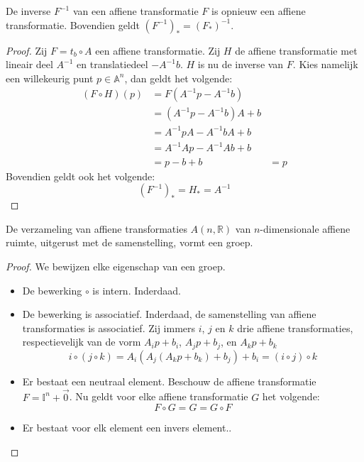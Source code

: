 \documentclass[main.tex]{subfiles}
\begin{document}
\begin{st}
  \label{st:samenstelling-affiene-transformatie-inverse}
  De inverse $F^{-1}$ van een affiene transformatie $F$ is opnieuw een affiene transformatie.
  Bovendien geldt $(F^{-1})_{*} = (F_{*})^{-1}$.

  \begin{proof}
    Zij $F = t_{b} \circ A$ een affiene transformatie.
    Zij $H$ de affiene transformatie met lineair deel $A^{-1}$ en translatiedeel $-A^{-1}b$.
    $H$ is nu de inverse van $F$.
    Kies namelijk een willekeurig punt $p\in \mathbb{A}^{n}$, dan geldt het volgende:
    \[
    \begin{array}{rll}
      (F \circ H)(p) &= F(A^{-1}p - A^{-1}b) &\\
                     &= (A^{-1}p - A^{-1}b)A + b &\\
                     &= A^{-1}pA - A^{-1}bA + b &\\
                     &= A^{-1}Ap - A^{-1}Ab + b &\\
                     &= p - b + b &= p
    \end{array}
    \]
    Bovendien geldt ook het volgende:
    \[ (F^{-1})_{*} = H_{*} = A^{-1} \]
  \end{proof}
\end{st} 

\begin{st}
  De verzameling van affiene transformaties $A(n,\mathbb{R})$ van $n$-dimensionale affiene ruimte, uitgerust met de samenstelling, vormt een groep.

  \begin{proof}
    We bewijzen elke eigenschap van een groep.
    \begin{itemize}
    \item De bewerking $\circ$ is intern.
      Inderdaad.
    \item De bewerking is associatief.
      Inderdaad, de samenstelling van affiene transformaties is associatief.
      Zij immers $i$, $j$ en $k$ drie affiene transformaties, respectievelijk van de vorm $A_{i}p+b_{i}$, $A_{j}p+b_{j}$, en  $A_{k}p+b_{k}$
      \[ i \circ (j \circ k) = A_{i}(A_{j}(A_{k}p+b_{k})+b_{j})+b_{i} = (i \circ j) \circ k\]
    \item Er bestaat een neutraal element.
      Beschouw de affiene transformatie $F = \mathbb{I}^{n} + \vec{0}$.
      Nu geldt voor elke affiene transformatie $G$ het volgende:
      \[ F \circ G = G = G \circ F \]
    \item Er bestaat voor elk element een invers element..
    \end{itemize}
  \end{proof}
\end{st}
\end{document}
